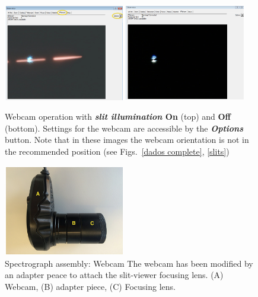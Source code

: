 \documentclass[a4paper, 11pt, fleqn]{memoir}
\begin{document}
\begin{figure}[t!]
    \centering
    \includegraphics[width=0.47\textwidth]{dados-operation-webcam1}
    \includegraphics[width=0.47\textwidth]{dados-operation-webcam2}
    \caption{Webcam operation with \textbf{\textit{slit illumination}
            On} (top) and \textbf{Off} (bottom).
        Settings for the webcam are accessible by the \textbf{\textit{Options}} button.
        \newline Note that in these images the webcam orientation is not in the recommended position (see Figs.~\ref{dados complete}, \ref{slits})}
    \label{operation webcam}
\end{figure}

\begin{figure}[t!]
    \centering
    \includegraphics[width=0.47\textwidth]{webcam}
    \caption{Spectrograph assembly: Webcam  \newline The webcam has been modified by an adapter peace to attach the slit-viewer focusing lens. \newline (A) Webcam, (B) adapter piece, (C) Focusing lens.}
    \label{webcam}
\end{figure}
\end{document}
